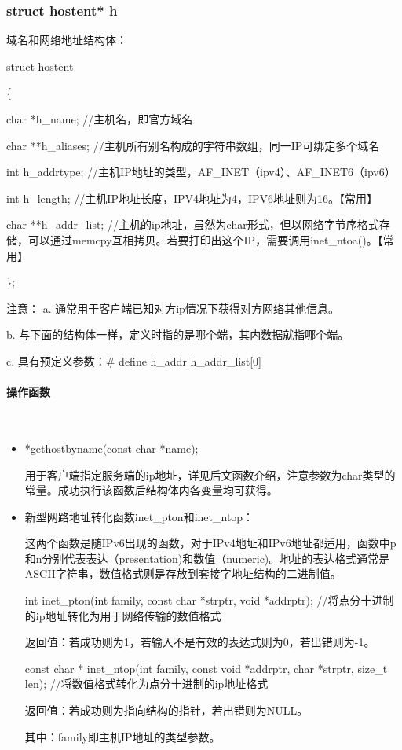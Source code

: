 \documentclass[UTF8]{article}%
\begin{document}
\subsubsection{struct hostent* h}

域名和网络地址结构体：

struct hostent

\{

\qquad    char *h\_name;  //主机名，即官方域名
    
\qquad    char **h\_aliases;  //主机所有别名构成的字符串数组，同一IP可绑定多个域名

\qquad    int h\_addrtype; //主机IP地址的类型，AF\_INET（ipv4）、AF\_INET6（ipv6）

\qquad    int h\_length;  //主机IP地址长度，IPV4地址为4，IPV6地址则为16。【常用】

\qquad    char **h\_addr\_list;  //主机的ip地址，虽然为char形式，但以网络字节序格式存储，可以通过memcpy互相拷贝。若要打印出这个IP，需要调用inet\_ntoa()。【常用】

\};

注意：
a. 通常用于客户端已知对方ip情况下获得对方网络其他信息。

b. 与下面的结构体一样，定义时指的是哪个端，其内数据就指哪个端。

c. 具有预定义参数：\# define h\_addr  h\_addr\_list[0]

\paragraph{操作函数}~{}


\begin{itemize}
    \item *gethostbyname(const char *name);
    
    用于客户端指定服务端的ip地址，详见后文函数介绍，注意参数为char类型的常量。成功执行该函数后结构体内各变量均可获得。

    \item 新型网路地址转化函数inet\_pton和inet\_ntop：
    
    这两个函数是随IPv6出现的函数，对于IPv4地址和IPv6地址都适用，函数中p和n分别代表表达（presentation)和数值（numeric)。地址的表达格式通常是ASCII字符串，数值格式则是存放到套接字地址结构的二进制值。

    int inet\_pton(int family, const char *strptr, void *addrptr);     //将点分十进制的ip地址转化为用于网络传输的数值格式
        
    返回值：若成功则为1，若输入不是有效的表达式则为0，若出错则为-1。
 
    const char * inet\_ntop(int family, const void *addrptr, char *strptr, size\_t len);     //将数值格式转化为点分十进制的ip地址格式

    返回值：若成功则为指向结构的指针，若出错则为NULL。

    其中：family即主机IP地址的类型参数。
    
\end{itemize}
\end{document}
